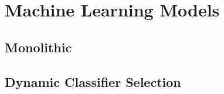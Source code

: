 \chapter{Machine Learning Models}\label{chapter:models}

\section{Monolithic}
    

\section{Dynamic Classifier Selection}
    